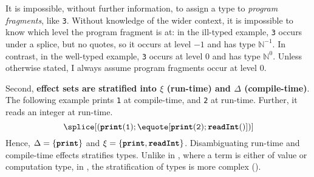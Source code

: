   It is impossible, without further information, to assign a type to \textit{program fragments}, like \texttt{3}. Without knowledge of the wider context, it is impossible to know which level the program fragment is at: in the ill-typed example, \texttt{3} occurs under a splice, but no quotes, so it occurs at level $-1$ and has type $\mathbb{N}^{-1}$. In contrast, in the well-typed example, \texttt{3} occurs at level $0$ and has type $\mathbb{N}^0$. Unless otherwise stated, I always assume program fragments occur at level $0$.

  Second, \textbf{effect sets are stratified into $\xi$ (run-time) and $\Delta$ (compile-time)}.\\
  The following example prints \texttt{1} at compile-time, and \texttt{2} at run-time. Further, it reads an integer at run-time.
\[\splice[{(\textbf{\texttt{print}}(\texttt{1}); \equote[\textbf{\texttt{print}}(\texttt{2}); \textbf{\texttt{readInt}}()])}]\]
Hence, $\Delta = \{ \textbf{\texttt{print}} \}$ and $\xi = \{ \textbf{\texttt{print}}, \textbf{\texttt{readInt}} \}$. Disambiguating run-time and compile-time effects stratifies types. Unlike in \efflang{}, where a term is either of value or computation type, in \sourceLang{}, the stratification of types is more complex ().

